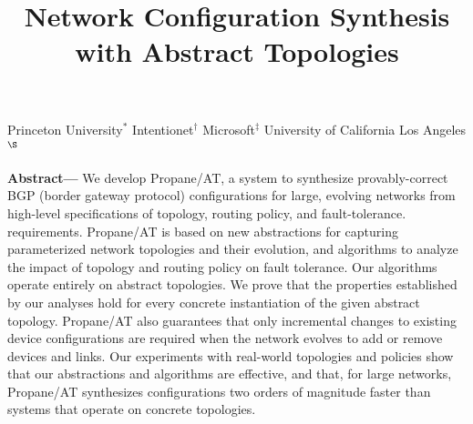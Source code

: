 \documentclass[numbers, 10pt]{sigplanconf}
\newcommand{\sysname}{{\text{}\small \sf Propane/AT}\xspace}
\begin{document}
\setlength{\pdfpageheight}{\paperheight}
\setlength{\pdfpagewidth}{\paperwidth}

\toappear{}


\title{Network Configuration Synthesis with Abstract Topologies \vspace{1cm}}




{Princeton University$^*$ \hspace{0.2in} Intentionet$^\dagger$ \hspace{0.2in}  Microsoft$^\ddagger$ \hspace{0.2in}  University of California Los Angeles$^\S$}

\maketitle


%
%
%
%

\textbf{Abstract---}
We develop \sysname, a system to synthesize provably-correct
BGP (border gateway protocol) configurations for large, evolving networks from high-level
specifications of topology, routing policy, and fault-tolerance.
requirements. \sysname is based on new abstractions for capturing
parameterized network topologies and their evolution, and algorithms
to analyze the impact of topology and routing policy on fault
tolerance. Our algorithms operate entirely on abstract topologies.  We
prove that the properties established by our analyses hold for every
concrete instantiation of the given abstract topology. \sysname
also guarantees that only incremental changes to existing device configurations
are required when the network evolves to add or remove devices and
links. Our experiments with real-world topologies and policies show
that our abstractions and algorithms are effective, and that, for large
networks, \sysname synthesizes configurations two orders of magnitude
faster than systems that operate on concrete topologies.
\end{document}
